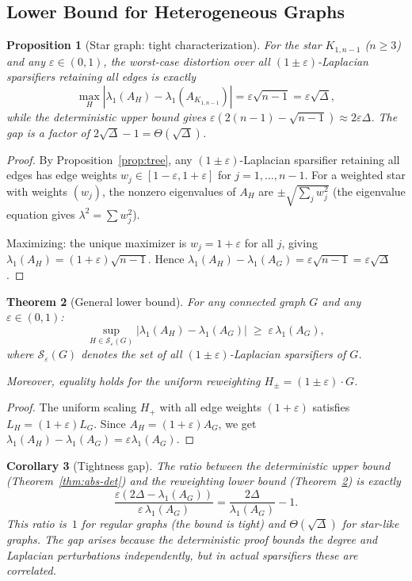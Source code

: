 \documentclass[11pt]{article}
\newtheorem{theorem}{Theorem}[section]
\newtheorem{proposition}[theorem]{Proposition}
\newtheorem{corollary}[theorem]{Corollary}
\theoremstyle{definition}
\newcommand{\eps}{\varepsilon}
\newcommand{\lamH}{\lambda_1(A_H)}
\newcommand{\lamG}{\lambda_1(A_G)}
\newcommand{\AG}{A_G}
\newcommand{\AH}{A_H}
\newcommand{\LG}{L_G}
\newcommand{\LH}{L_H}
\begin{document}
\subsection{Lower Bound for Heterogeneous Graphs}

\begin{proposition}[Star graph: tight characterization]\label{prop:star-tight}
For the star $K_{1,n-1}$ ($n \geq 3$) and any $\eps \in (0,1)$, the worst-case
distortion over all $(1\pm\eps)$-Laplacian sparsifiers retaining all edges is exactly
\[
\max_H |\lamH - \lambda_1(A_{K_{1,n-1}})| = \eps\sqrt{n-1} = \eps\sqrt{\Delta},
\]
while the deterministic upper bound gives $\eps(2(n-1) - \sqrt{n-1}) \approx 2\eps\Delta$.
The gap is a factor of $2\sqrt{\Delta} - 1 = \Theta(\sqrt{\Delta})$.
\end{proposition}

\begin{proof}
By Proposition~\ref{prop:tree}, any $(1\pm\eps)$-Laplacian
sparsifier retaining all edges has edge weights $w_j \in [1-\eps, 1+\eps]$ for
$j = 1, \ldots, n-1$. For a weighted star with weights $(w_j)$, the nonzero eigenvalues
of $\AH$ are $\pm\sqrt{\sum_j w_j^2}$
(the eigenvalue equation gives $\lambda^2 = \sum w_j^2$).

Maximizing: the unique maximizer
is $w_j = 1+\eps$ for all $j$, giving $\lamH = (1+\eps)\sqrt{n-1}$. Hence
$\lamH - \lamG = \eps\sqrt{n-1} = \eps\sqrt{\Delta}$.
\end{proof}

\begin{theorem}[General lower bound]\label{thm:general-lower}
For any connected graph $G$ and any $\eps \in (0,1)$:
\[
\sup_{H \in \mathcal{S}_\eps(G)} |\lamH - \lamG| \;\geq\; \eps\,\lamG,
\]
where $\mathcal{S}_\eps(G)$ denotes the set of all $(1\pm\eps)$-Laplacian sparsifiers
of $G$.

Moreover, equality holds for the uniform reweighting $H_{\pm} = (1\pm\eps)\cdot G$.
\end{theorem}

\begin{proof}
The uniform scaling $H_+$ with all edge weights $(1+\eps)$ satisfies
$\LH = (1+\eps)\LG$. Since $\AH = (1+\eps)\AG$, we get
$\lamH - \lamG = \eps\lamG$.
\end{proof}

\begin{corollary}[Tightness gap]\label{cor:gap}
The ratio between the deterministic upper bound (Theorem~\ref{thm:abs-det}) and the
reweighting lower bound (Theorem~\ref{thm:general-lower}) is exactly
\[
\frac{\eps(2\Delta - \lamG)}{\eps\,\lamG} = \frac{2\Delta}{\lamG} - 1.
\]
This ratio is~$1$ for regular graphs (the bound is tight) and
$\Theta(\sqrt{\Delta})$ for star-like graphs. The gap arises because the
deterministic proof bounds the degree and Laplacian perturbations independently,
but in actual sparsifiers these are correlated.
\end{corollary}
\end{document}
